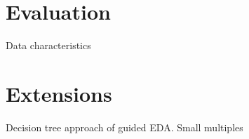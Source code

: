 \section{Evaluation}

Data characteristics

\section{Extensions}
Decision tree approach of guided EDA.
Small multiples



